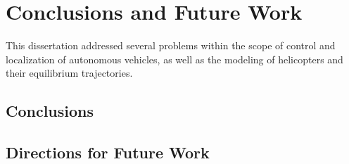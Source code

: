 \chapter{Conclusions and Future Work}
\label{ch:conclusions}

This dissertation addressed several problems within the scope of control and 
localization of autonomous vehicles, as well as the modeling of helicopters and their 
equilibrium trajectories.

\section{Conclusions}



\section{Directions for Future Work}


